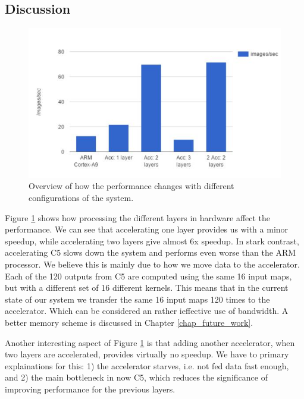 \subsection{Discussion} \label{sec_result_discussion}

\begin{figure}[h!]
	\centering
	\includegraphics[width=1.0\textwidth]{Figures/Results/results_acc_improvements}
	\caption{Overview of how the performance changes with different configurations of the system.}
	\label{fig_results_acc_improvements}
\end{figure}

Figure \ref{fig_results_acc_improvements} shows how processing the different layers in hardware affect the performance. We can see that accelerating one layer provides us with a minor speedup, while accelerating two layers give almost 6x speedup. In stark contrast, accelerating C5 slows down the system and performs even worse than the ARM processor. We believe this is mainly due to how we move data to the accelerator. Each of the 120 outputs from C5 are computed using the same 16 input maps, but with a different set of 16 different kernels. This means that in the current state of our system we transfer the same 16 input maps 120 times to the accelerator. Which can be considered an rather ieffective use of bandwidth. A better memory scheme is discussed in Chapter \ref{chap_future_work}.

Another interesting aspect of Figure \ref{fig_results_acc_improvements} is that adding another accelerator, when two layers are accelerated, provides virtually no speedup. We have to primary explainations for this: 1) the accelerator starves, i.e. not fed data fast enough, and 2) the main bottleneck in now C5, which reduces the significance of improving performance for the previous layers.

